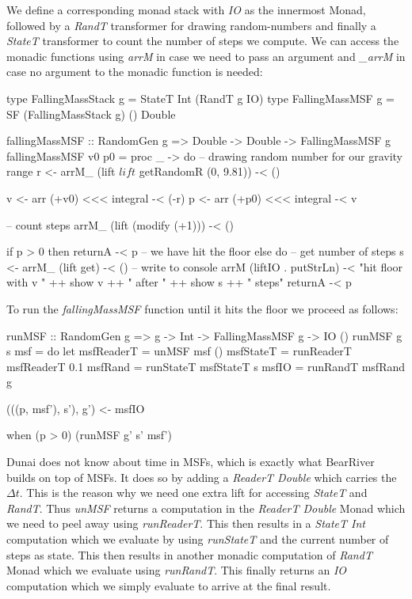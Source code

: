 We define a corresponding monad stack with \textit{IO} as the innermost Monad, followed by a \textit{RandT} transformer for drawing random-numbers and finally a \textit{StateT} transformer to count the number of steps we compute. We can access the monadic functions using \textit{arrM} in case we need to pass an argument and \textit{\_arrM} in case no argument to the monadic function is needed:

\begin{HaskellCode}
type FallingMassStack g = StateT Int (RandT g IO)
type FallingMassMSF g   = SF (FallingMassStack g) () Double

fallingMassMSF :: RandomGen g => Double -> Double -> FallingMassMSF g
fallingMassMSF v0 p0 = proc _ -> do
  -- drawing random number for our gravity range
  r <- arrM_ (lift $ lift $ getRandomR (0, 9.81)) -< ()

  v <- arr (+v0) <<< integral -< (-r)
  p <- arr (+p0) <<< integral -< v

  -- count steps
  arrM_ (lift (modify (+1))) -< ()

  if p > 0
    then returnA -< p
    -- we have hit the floor
    else do
      -- get number of steps
      s <- arrM_ (lift get) -< ()
      -- write to console
      arrM (liftIO . putStrLn) -< "hit floor with v " ++ show v ++ 
                                  " after " ++ show s ++ " steps"
      returnA -< p
\end{HaskellCode}

To run the \textit{fallingMassMSF} function until it hits the floor we proceed as follows:

\begin{HaskellCode}
runMSF :: RandomGen g => g -> Int -> FallingMassMSF g -> IO ()
runMSF g s msf = do
  let msfReaderT = unMSF msf ()
      msfStateT  = runReaderT msfReaderT 0.1
      msfRand    = runStateT msfStateT s
      msfIO      = runRandT msfRand g

  (((p, msf'), s'), g') <- msfIO
  
  when (p > 0) (runMSF g' s' msf')
\end{HaskellCode}

Dunai does not know about time in MSFs, which is exactly what BearRiver builds on top of MSFs. It does so by adding a \textit{ReaderT Double} which carries the $\Delta t$. This is the reason why we need one extra lift for accessing \textit{StateT} and \textit{RandT}. Thus \textit{unMSF} returns a computation in the \textit{ReaderT Double} Monad which we need to peel away using \textit{runReaderT}. This then results in a \textit{StateT Int} computation which we evaluate by using \textit{runStateT} and the current number of steps as state. This then results in another monadic computation of \textit{RandT} Monad which we evaluate using \textit{runRandT}. This finally returns an \textit{IO} computation which we simply evaluate to arrive at the final result.